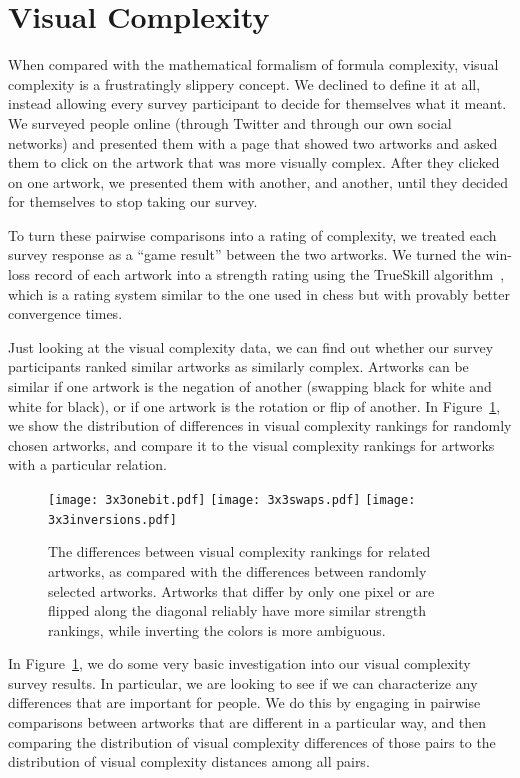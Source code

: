 \documentclass[11pt]{article}
\begin{document}
\section*{Visual Complexity}

When compared with the mathematical formalism of formula complexity, visual
complexity is a frustratingly slippery concept.  We declined to define it at
all, instead allowing every survey participant to decide for themselves what it
meant.  We surveyed people online (through Twitter and through our own social
networks) and presented them with a page that showed two artworks and asked
them to click on the artwork that was more visually complex.  After they
clicked on one artwork, we presented them with another, and another, until
they decided for themselves to stop taking our survey.

To turn these pairwise comparisons into a rating of complexity,
we treated each survey response as a ``game result'' between the
two artworks. We turned the win-loss record of each artwork into a
strength rating using the TrueSkill algorithm~\cite{trueskill}, which is a
rating system similar to the one used in chess but with provably better
convergence times.

Just looking at the visual complexity data, we can find out whether our survey
participants ranked similar artworks as similarly complex.  Artworks can be
similar if one artwork is the negation of another (swapping black for white and
white for black), or if one artwork is the rotation or flip of another.  In
Figure~\ref{fig:differences}, we show the distribution of differences in visual
complexity rankings for randomly chosen artworks, and compare it to the visual
complexity rankings for artworks with a particular relation.

\begin{figure}
\begin{center}
\texttt{[image: 3x3onebit.pdf]} 
\texttt{[image: 3x3swaps.pdf]} 
\texttt{[image: 3x3inversions.pdf]}
\end{center}

\caption{The differences between visual complexity rankings for related artworks, as compared with the differences between randomly selected artworks.  Artworks that differ by only one pixel or are flipped along the diagonal reliably have more similar strength rankings, while inverting the colors is more ambiguous.}
\label{fig:differences}
\end{figure}

In Figure~\ref{fig:differences}, we do some very basic investigation into our
visual complexity survey results.  In particular, we are looking to see if we
can characterize any differences that are important for people.  We do this by
engaging in pairwise comparisons between artworks that are different in a
particular way, and then comparing the distribution of visual complexity
differences of those pairs to the distribution of visual complexity distances
among all pairs.
\end{document}
